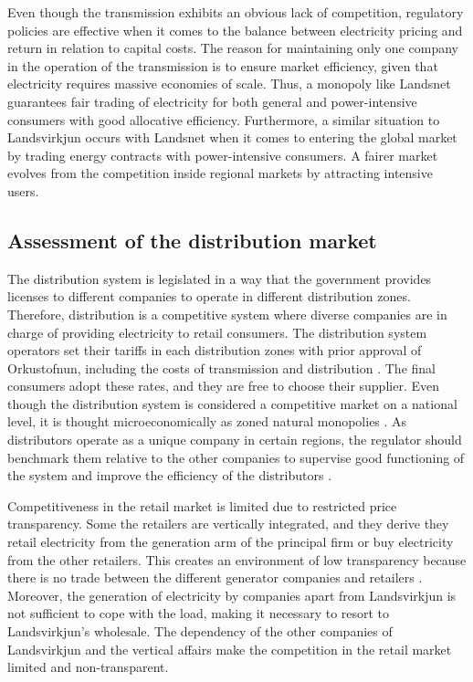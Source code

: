 \documentclass[svn, final]{rureport}
\begin{document}
Even though the transmission exhibits an obvious lack of competition, regulatory policies are effective when it comes to the balance between electricity pricing and return in relation to capital costs. The reason for maintaining only one company in the operation of the transmission is to ensure market efficiency, given that electricity requires massive economies of scale. Thus, a monopoly like Landsnet guarantees fair trading of electricity for both general and power-intensive consumers with good allocative efficiency. Furthermore, a similar situation to Landsvirkjun occurs with Landsnet when it comes to entering the global market by trading energy contracts with power-intensive consumers. A fairer market evolves from the competition inside regional markets by attracting intensive users. 

\subsection{Assessment of the distribution market}

The distribution system is legislated in a way that the government provides licenses to different companies to operate in different distribution zones. Therefore, distribution is a competitive system where diverse companies are in charge of providing electricity to retail consumers. The distribution system operators set their tariffs in each distribution zones with prior approval of Orkustofnun, including the costs of transmission and distribution \cite{electricity_act_2003, laubach_2005}. The final consumers adopt these rates, and they are free to choose their supplier. Even though the distribution system is considered a competitive market on a national level, it is thought microeconomically as zoned natural monopolies \cite{our_energy_2016, laubach_2005, Hreinsson_2008}. As distributors operate as a unique company in certain regions, the regulator should benchmark them relative to the other companies to supervise good functioning of the system and improve the efficiency of the distributors \cite{our_energy_2016}. 

Competitiveness in the retail market is limited due to restricted price transparency. Some the retailers are vertically integrated, and they derive they retail electricity from the generation arm of the principal firm or buy electricity from the other retailers. This creates an environment of low transparency because there is no trade between the different generator companies and retailers \cite{copen_econ_improve_2017}. Moreover, the generation of electricity by companies apart from Landsvirkjun is not sufficient to cope with the load, making it necessary to resort to Landsvirkjun’s wholesale. The dependency of the other companies of Landsvirkjun and the vertical affairs make the competition in the retail market limited and non-transparent. 
\end{document}
